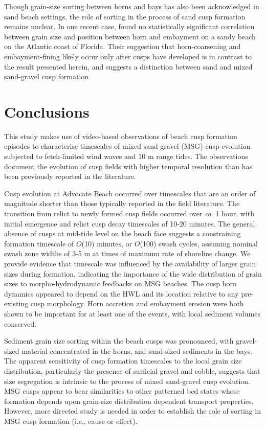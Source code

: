 Though grain-size sorting between horns and bays has also been acknowledged in sand beach settings, the role of sorting in the process of sand cusp formation remains unclear. In one recent case, \citet{VanGaalen_etal2011} found no statistically significant correlation between grain size and position between horn and embayment on a sandy beach on the Atlantic coast of Florida. Their suggestion that horn-coarsening and embayment-fining likely occur only after cusps have developed is in contrast to the result presented herein, and suggests a distinction between sand and mixed sand-gravel cusp formation.

 
\section{Conclusions}

This study makes use of video-based observations of beach cusp formation episodes to characterise timescales of mixed sand-gravel (MSG) cusp evolution subjected to fetch-limited wind waves and 10 m range tides. The observations document the evolution of cusp fields with higher temporal resolution than has been previously reported in the literature.

Cusp evolution at Advocate Beach occurred over timescales that are an order of magnitude shorter than those typically reported in the field literature. The transition from relict to newly formed cusp fields occurred over \textit{ca}. 1 hour, with initial emergence and relict cusp decay timescales of 10-20 minutes. The general absence of cusps at mid-tide level on the beach face suggests a constraining formation timescale of $O$(10) minutes, or $O$(100) swash cycles, assuming nominal swash zone widths of 3-5 m at times of maximum rate of shoreline change. We provide evidence that timescale was influenced by the availability of larger grain sizes during formation, indicating the importance of the wide distribution of grain sizes to morpho-hydrodynamic feedbacks on MSG beaches. The cusp horn dynamics appeared to depend on the HWL and its location relative to any pre-existing cusp morphology. Horn accretion and embayment erosion were both shown to be important for at least one of the events, with local sediment volumes conserved. 

Sediment grain size sorting within the beach cusps was pronounced, with gravel-sized material concentrated in the horns, and sand-sized sediments in the bays. The apparent sensitivity of cusp formation timescales to the local grain size distribution, particularly the presence of surficial gravel and cobble, suggests that size segregation is intrinsic to the process of mixed sand-gravel cusp evolution. MSG cusps appear to bear similarities to other patterned bed states \citep[e.g., sorted bed forms,][]{Murray_Thieler2004} whose formation depends upon grain-size distribution dependent transport properties. However, more directed study is needed in order to establish the role of sorting in MSG cusp formation (i.e., cause or effect).









